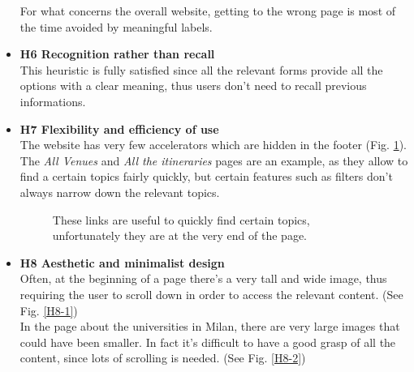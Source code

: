 \begin{itemize}
\begin{enumerate}
        \end{enumerate}  
        For what concerns the overall website, getting to the wrong page is most of the time avoided by meaningful labels.
    \item \textbf{H6 Recognition rather than recall}\\
        This heuristic is fully satisfied since all the relevant forms provide all the options with a clear meaning, thus users don't need to recall previous informations.
    \item \textbf{H7 Flexibility and efficiency of use}\\
        The website has very few accelerators which are hidden in the footer (Fig. \ref{H7-1}). The  \emph{All Venues} and \emph{All the itineraries} pages are an example, as they allow to find a certain topics fairly quickly, but certain features such as filters don't always narrow down the relevant topics.
        \begin{figure}[!ht]
            \begin{minipage}{\linewidth}
                \centering
                \captionsetup{justification=centering}
                \caption{These links are useful to quickly find certain topics,\\unfortunately they are at the very end of the page.}
                \label{H7-1}
            \end{minipage}
        \end{figure}
    \item \textbf{H8 Aesthetic and minimalist design}\\
        Often, at the beginning of a page there's a very tall and wide image, thus requiring the user to scroll down in order to access the relevant content. (See Fig. \ref{H8-1})\\
        In the page about the universities in Milan, there are very large images that could have been smaller. In fact it's difficult to have a good grasp of all the content, since lots of scrolling is needed. (See Fig. \ref{H8-2})
        

\end{itemize}
